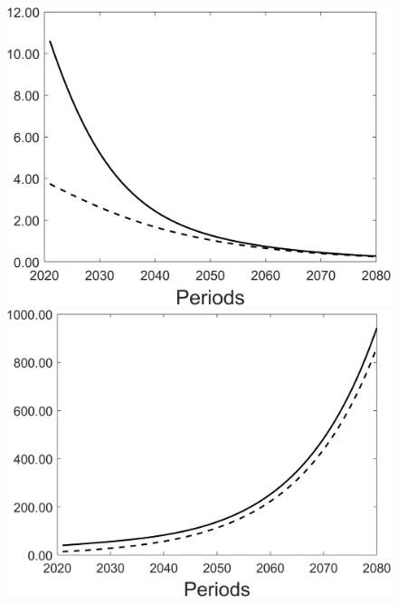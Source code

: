 \begin{figure}[h!!]
\begin{minipage}[]{0.32\textwidth}
	\end{minipage}
\begin{minipage}[]{0.32\textwidth}
	\includegraphics[width=1\textwidth]{../../codding_model/Own/figures/Rep_agent/staticBAU_LF_separate_xc_periods59_eppsilon4.00_zeta1.40_Ad08_Ac04_thetac0.70_thetad0.56_HetGrowth1_tauul0.181_util0_withtarget0_lgd0.png}
\end{minipage}
	\begin{minipage}[]{0.32\textwidth}
		\includegraphics[width=1\textwidth]{../../codding_model/Own/figures/Rep_agent/staticBAU_LF_separate_xd_periods59_eppsilon4.00_zeta1.40_Ad08_Ac04_thetac0.70_thetad0.56_HetGrowth1_tauul0.181_util0_withtarget0_lgd0.png}
	\end{minipage}
\end{figure}

